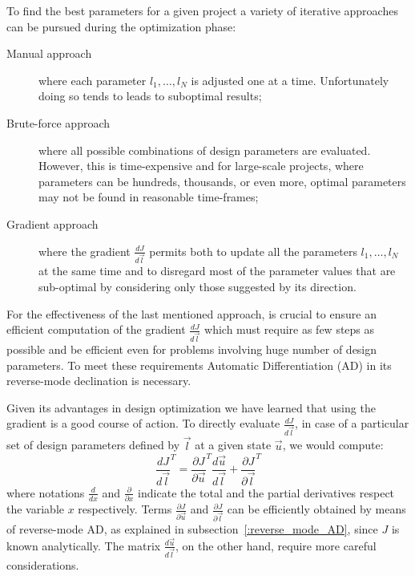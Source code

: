 To find the best parameters for a given project a variety of iterative approaches can be pursued during the optimization phase:
\begin{description}
	\item[Manual approach] where each parameter $l_1, \dots, l_N$ is adjusted one at a time. Unfortunately doing so tends to leads to suboptimal results;
	\item[Brute-force approach] where all possible combinations of design parameters are evaluated. However, this is time-expensive and for large-scale projects, where parameters can be hundreds, thousands, or even more, optimal parameters may not be found in reasonable time-frames;
	\item[Gradient approach] where the gradient $\frac{dJ}{d\vec{l}}$ permits both to update all the parameters $l_1, \dots, l_N$ at the same time and to disregard most of the parameter values that are sub-optimal by considering only those suggested by its direction.
\end{description}
For the effectiveness of the last mentioned approach, is crucial to ensure an efficient computation of the gradient $\frac{dJ}{d\vec{l}}$ which must require as few steps as possible and be efficient even for problems involving huge number of design parameters. To meet these requirements Automatic Differentiation (AD) in its reverse-mode declination is necessary.

\bigskip
Given its advantages in design optimization we have learned that using the gradient is a good course of action. To directly evaluate $\frac{dJ}{d\vec{l}}$, in case of a particular set of design parameters defined by $\vec{l}$ at a given state $\vec{u}$, we would compute:
\begin{equation}
	\label{eqn:generic_gradient_design_opt}
	\frac{dJ}{d\vec{l}}^T = \frac{\partial J}{\partial \vec{u}}^T \frac{d\vec{u}}{d\vec{l}} + \frac{\partial J}{\partial \vec{l}}^T
\end{equation}
where notations $\frac{d}{dx}$ and $\frac{\partial}{\partial x}$ indicate the total and the partial derivatives respect the variable $x$ respectively.
Terms $\frac{\partial J}{\partial \vec{u}}$ and $\frac{\partial J}{\partial \vec{l}}$ can be efficiently obtained by means of reverse-mode AD, as explained in subsection~\vref{:reverse_mode_AD}, since $J$ is known analytically. The matrix $\frac{d\vec{u}}{d\vec{l}}$, on the other hand, require more careful considerations.

